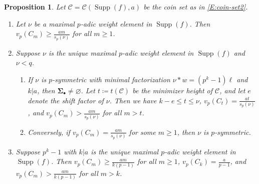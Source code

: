 \documentclass[10pt,a4paper]{amsart}
\newtheorem{proposition}{Proposition}
\newcommand{\Sb}{\bSig_\bullet}
\DeclareMathOperator{\Supp}{Supp}
\newcommand{\bSig}{\mathbf\Sigma}
\newcommand{\cC}{\mathcal{C}}
\begin{document}
\begin{proposition}\label{P:bound}
Let $\cC=\cC(\Supp(f),a)$ be the coin set as in \eqref{E:coin-set2}. 
\begin{enumerate}
\item 
Let $\nu$ be a maximal $p$-adic weight element in $\Supp(f)$. Then     
$
        v_p(C_m) \ge \frac{am}{s_p(\nu)}
    $ for all $m\ge 1$.   
\item 
Suppose $\nu$ is the unique maximal $p$-adic weight element in $\Supp(f)$ and $\nu<q$.
\begin{enumerate}
\item If $\nu$ is $p$-symmetric with minimal factorization
    $\nu * w = (p^k-1)\ell$ and $k|a$,
then $\Sb\neq \varnothing$.
Let $t \coloneqq t(\cC)$
be the minimizer height of $\cC$,
and let $e$ denote the shift factor of $\nu$.
Then we have $k-e\le t\le \nu$, $v_p(C_t)=\frac{at}{s_p(\nu)}$, and 
$v_p(C_m)>\frac{am}{s_p(\nu)}$ for all $m>t$.
\item 
Conversely, if $v_p(C_m)=\frac{am}{s_p(\nu)}$ for some $m\ge 1$, then 
$\nu$ is $p$-symmetric.    
\end{enumerate}
\item Suppose $p^k-1$ with $k|a$ is the unique maximal $p$-adic weight element in $\Supp(f)$.
Then $v_p(C_m) \ge \frac{am}{k(p-1)}$ for all $m\ge 1$,
$v_p(C_k)=\frac{a}{p-1}$, 
and $v_p(C_m)>\frac{am}{k(p-1)}$ for all $m>k$.
\end{enumerate}
\end{proposition}
\end{document}
